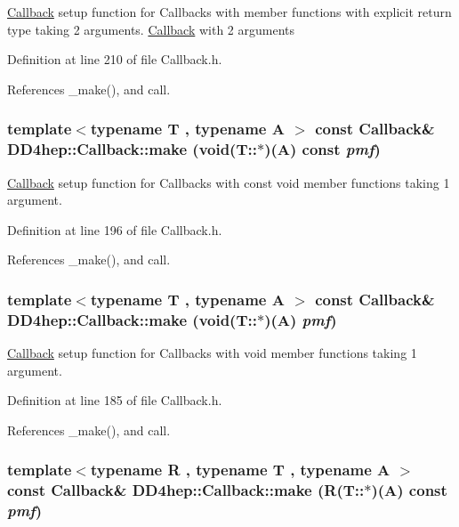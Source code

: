 \hyperlink{class_d_d4hep_1_1_callback}{Callback} setup function for Callbacks with member functions with explicit return type taking 2 arguments. \hyperlink{class_d_d4hep_1_1_callback}{Callback} with 2 arguments 

Definition at line 210 of file Callback.h.

References \_\-make(), and call.\hypertarget{class_d_d4hep_1_1_callback_a48205c95d6aa007ce23b157d7977c704}{
\subsubsection[{make}]{\setlength{\rightskip}{0pt plus 5cm}template$<$typename T , typename A $>$ const {\bf Callback}\& DD4hep::Callback::make (void(T::$\ast$)(A) const  {\em pmf})}}
\label{class_d_d4hep_1_1_callback_a48205c95d6aa007ce23b157d7977c704}


\hyperlink{class_d_d4hep_1_1_callback}{Callback} setup function for Callbacks with const void member functions taking 1 argument. 

Definition at line 196 of file Callback.h.

References \_\-make(), and call.\hypertarget{class_d_d4hep_1_1_callback_ab277609e7c80369b36be7ab82531cf7f}{
\subsubsection[{make}]{\setlength{\rightskip}{0pt plus 5cm}template$<$typename T , typename A $>$ const {\bf Callback}\& DD4hep::Callback::make (void(T::$\ast$)(A) {\em pmf})}}
\label{class_d_d4hep_1_1_callback_ab277609e7c80369b36be7ab82531cf7f}


\hyperlink{class_d_d4hep_1_1_callback}{Callback} setup function for Callbacks with void member functions taking 1 argument. 

Definition at line 185 of file Callback.h.

References \_\-make(), and call.\hypertarget{class_d_d4hep_1_1_callback_a128131dc329fa90dd9c4c73652050023}{
\subsubsection[{make}]{\setlength{\rightskip}{0pt plus 5cm}template$<$typename R , typename T , typename A $>$ const {\bf Callback}\& DD4hep::Callback::make (R(T::$\ast$)(A) const  {\em pmf})}}
\label{class_d_d4hep_1_1_callback_a128131dc329fa90dd9c4c73652050023}


